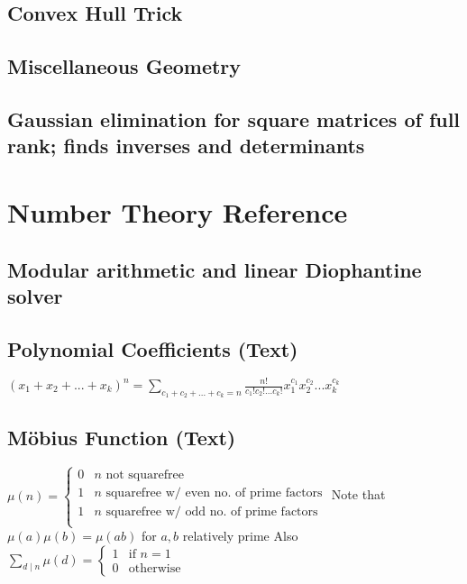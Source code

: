 \documentclass[12pt]{extarticle}
\begin{document}
\begin{multicols*}{2}
\subsection{Convex Hull Trick} %



\subsection{Miscellaneous Geometry} %


\subsection{Gaussian elimination for square matrices of full rank; finds
inverses and determinants} %


\section{Number Theory Reference}

% 

\subsection{Modular arithmetic and linear Diophantine solver} %


\subsection{Polynomial Coefficients (Text)} %
$(x_1 + x_2 + ... + x_k)^n = \sum_{c_1 + c_2 + ... + c_k = n}
\frac{n!}{c_1! c_2! ... c_k!} x_1^{c_1} x_2^{c_2} ... x_k^{c_k}$

\subsection{M\"obius Function (Text)} %
$\mu(n) = \begin{cases}
0 & \text{$n$ not squarefree} \\
1 & \text{$n$ squarefree w/ even no. of prime factors} \\
1 & \text{$n$ squarefree w/ odd no. of prime factors} \\
\end{cases}$
Note that $\mu(a) \mu(b) = \mu(ab)$ for $a, b$ relatively prime
Also $\sum_{d \mid n} \mu(d) = \begin{cases} 1 & \text{if $n = 1$} \\
0 & \text{otherwise} \end{cases}$


\end{multicols*}
\end{document}
